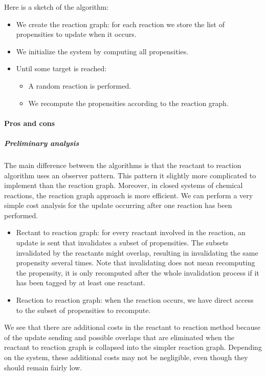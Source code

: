 Here is a sketch of the algorithm:
\begin{itemize}
  \item We create the reaction graph: for each reaction we store the list of propensities to update when it occurs.
  \item We initialize the system by computing all propensities.
  \item Until some target is reached:
    \begin{itemize}
      \item A random reaction is performed.
      \item We recompute the propensities according to the reaction graph.
    \end{itemize}
\end{itemize}

\paragraph{Pros and cons}

\subparagraph{Preliminary analysis} The main difference between the algorithms is that the reactant to reaction algorithm uses an observer pattern. This pattern it slightly more complicated to implement than the reaction graph. Moreover, in closed systems of chemical reactions, the reaction graph approach is more efficient. We can perform a very simple cost analysis for the update occurring after one reaction has been performed.

\begin{itemize}
  \item Rectant to reaction graph: for every reactant involved in the reaction, an update is sent that invalidates a subset of propensities. The subsets invalidated by the reactants might overlap, resulting in invalidating the same propensity several times. Note that invalidating does not mean recomputing the propensity, it is only recomputed after the whole invalidation process if it has been tagged by at least one reactant.
  \item Reaction to reaction graph: when the reaction occurs, we have direct access to the subset of propensities to recompute.
\end{itemize}

We see that there are additional costs in the reactant to reaction method because of the update sending and possible overlaps that are eliminated when the reactant to reaction graph is collapsed into the simpler reaction graph. Depending on the system, these additional costs may not be negligible, even though they should remain fairly low.

